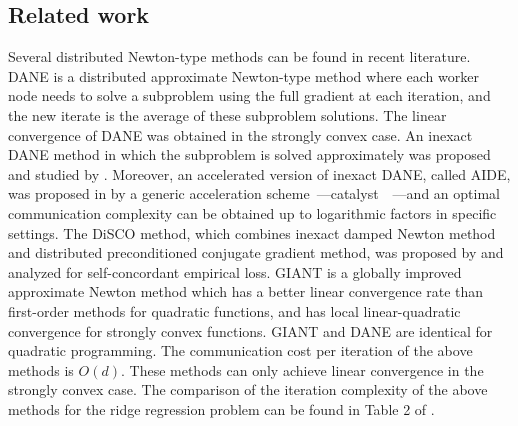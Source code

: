 \documentclass[12pt]{article}
\begin{document}
\subsection{Related work}

Several distributed Newton-type methods can be found in recent literature. DANE \citep{DANE} is a distributed approximate Newton-type method where each worker node needs to solve a subproblem using the full gradient at each iteration, and the new iterate is the average of these subproblem solutions. The linear convergence of DANE was obtained in the strongly convex case. An inexact DANE method in which the subproblem is solved approximately was proposed and studied by \citet{AIDE}. Moreover, an accelerated version of inexact DANE, called AIDE, was proposed in  \citep{AIDE} by a generic acceleration scheme~---catalyst~\citep{lin2015universal}~---and an optimal communication complexity can be obtained up to logarithmic factors in specific settings. The DiSCO method, which combines inexact damped Newton method and distributed preconditioned conjugate gradient method, was proposed by \citet{DISCO} and analyzed for self-concordant empirical loss. GIANT \citep{GIANT2018} is a globally improved approximate Newton method which has a better linear convergence rate than first-order methods for quadratic functions, and has local linear-quadratic convergence for strongly convex functions. GIANT and DANE are identical for quadratic programming. The communication cost per iteration of the above methods is $O(d)$. These methods can only achieve linear convergence in the strongly convex case. The comparison of the iteration complexity of the above methods for the ridge regression problem can be found in Table 2 of \citep{GIANT2018}. 
\end{document}
